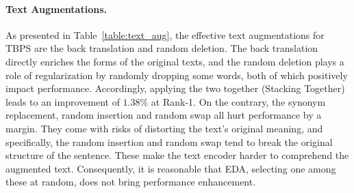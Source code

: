 \documentclass[letterpaper]{article} %
\begin{document}
\paragraph{Text Augmentations.} 
As presented in Table~\ref{table:text_aug}, the effective text augmentations for TBPS are the back translation and random deletion.
The back translation directly enriches the forms of the original texts, and the random deletion plays a role of regularization by randomly dropping some words,
both of which positively impact performance.
Accordingly, applying the two together (Stacking Together) leads to an improvement of $1.38\%$ at Rank-1.
On the contrary, the synonym replacement, random insertion and random swap all hurt performance by a margin.
They come with risks of distorting the text's original meaning, and specifically, the random insertion and random swap tend to break the original structure of the sentence.
These make the text encoder harder to comprehend the augmented text.
Consequently, it is reasonable that EDA, selecting one among these at random, does not bring performance enhancement.



\end{document}
